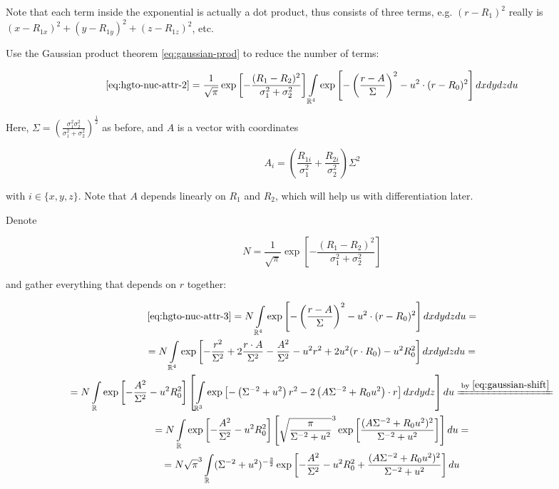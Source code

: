\documentclass{article}
\newcommand{\equalby}[1]{\xlongequal{\text{by }\eqref{#1}}}
\begin{document}
\begin{appendices}
Note that each term inside the exponential is actually a dot product, thus consists of three terms, e.g. \((r-R_1)^2\) really is \((x-R_{1x})^2+(y-R_{1y})^2+(z-R_{1z})^2\), etc.

Use the Gaussian product theorem \eqref{eq:gaussian-prod} to reduce the number of terms:

\begin{equation} \label{eq:hgto-nuc-attr-3}
\begin{gathered}
\eqref{eq:hgto-nuc-attr-2} = \frac{1}{\sqrt\pi} \exp\left[-\frac{(R_1-R_2)^2}{\sigma_1^2 + \sigma_2^2}\right] \int\limits_{\mathbb{R}^4}
\exp\left[-\left(\frac{r-A}{\Sigma}\right)^2 - u^2\cdot (r-R_0)^2\right] dxdydzdu
\end{gathered}
\end{equation}

Here, \(\Sigma = \left(\frac{\sigma_1^2\sigma_2^2}{\sigma_1^2+\sigma_2^2}\right)^\frac{1}{2}\) as before, and \(A\) is a vector with coordinates

\begin{equation} \label{eq:hgto-nuc-attr-a-def}
A_i = \left(\frac{R_{1i}}{\sigma_1^2}+\frac{R_{2i}}{\sigma_2^2}\right)\Sigma^2
\end{equation}

with \(i \in \{x,y,z\}\). Note that \(A\) depends linearly on \(R_1\) and \(R_2\), which will help us with differentiation later.

Denote

\begin{equation}
N = \frac{1}{\sqrt\pi} \exp\left[-\frac{(R_1-R_2)^2}{\sigma_1^2 + \sigma_2^2}\right]
\end{equation}

and gather everything that depends on \(r\) together:

\begin{equation} \label{eq:hgto-nuc-attr-4}
\begin{gathered}
\eqref{eq:hgto-nuc-attr-3} = N \int\limits_{\mathbb{R}^4} \exp\left[-\left(\frac{r-A}{\Sigma}\right)^2 - u^2\cdot (r-R_0)^2\right] dxdydzdu = \\
= N \int\limits_{\mathbb{R}^4} \exp\left[ -\frac{r^2}{\Sigma^2} + 2\frac{r\cdot A}{\Sigma^2} - \frac{A^2}{\Sigma^2} - u^2r^2 + 2u^2(r\cdot R_0) - u^2 R_0^2\right] dxdydzdu = \\
= N \int\limits_{\mathbb{R}} \exp\left[ - \frac{A^2}{\Sigma^2}  - u^2 R_0^2 \right] \left[ \int\limits_{\mathbb{R}^3} \exp\left[ -\left(\Sigma^{-2} + u^2\right)r^2 - 2\left( A \Sigma^{-2} + R_0 u^2 \right)\cdot r \right]  dxdydz\right] du \equalby{eq:gaussian-shift} \\
= N \int\limits_{\mathbb{R}} \exp\left[ - \frac{A^2}{\Sigma^2}  - u^2 R_0^2 \right] \left[  \sqrt{\frac{\pi}{\Sigma^{-2} + u^2}}^3 \exp\left[ \frac{(A \Sigma^{-2} + R_0 u^2)^2}{\Sigma^{-2} + u^2} \right] \right] du = \\
= N \sqrt{\pi}^3 \int\limits_{\mathbb{R}} (\Sigma^{-2} + u^2)^{-\frac{3}{2}} \exp\left[ - \frac{A^2}{\Sigma^2}  - u^2 R_0^2 + \frac{(A \Sigma^{-2} + R_0 u^2)^2}{\Sigma^{-2} + u^2} \right] du
\end{gathered}
\end{equation}


\end{appendices}
\end{document}
